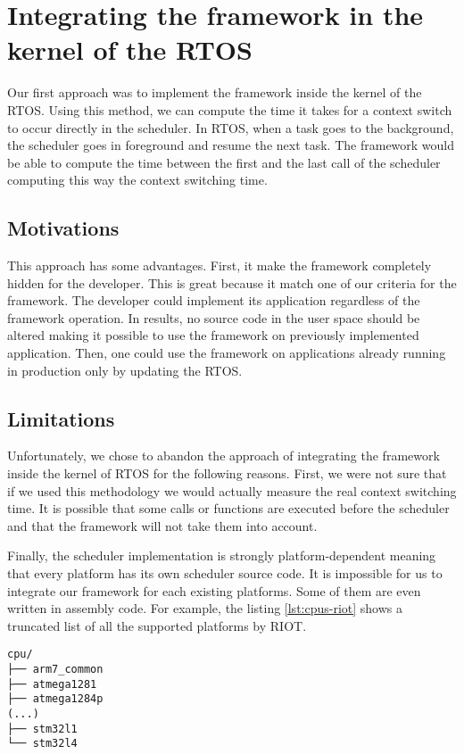 \section{Integrating the framework in the kernel of the RTOS \label{sec:kernel}}

Our first approach was to implement the framework inside the kernel of the RTOS.
Using this method, we can compute the time it takes for a context switch to occur directly in the scheduler.
In RTOS, when a task goes to the background, the scheduler goes in foreground and resume the next task.
The framework would be able to compute the time between the first and the last call of the scheduler computing this way the context switching time.

\subsection{Motivations}

This approach has some advantages.
First, it make the framework completely hidden for the developer.
This is great because it match one of our criteria for the framework.
The developer could implement its application regardless of the framework operation.
In results, no source code in the user space should be altered making it possible to use the framework on previously implemented application.
Then, one could use the framework on applications already running in production only by updating the RTOS.

\subsection{Limitations}

Unfortunately, we chose to abandon the approach of integrating the framework inside the kernel of RTOS for the following reasons.
First, we were not sure that if we used this methodology we would actually measure the real context switching time.
It is possible that some calls or functions are executed before the scheduler and that the framework will not take them into account.

Finally, the scheduler implementation is strongly platform-dependent meaning that every platform has its own scheduler source code.
It is impossible for us to integrate our framework for each existing platforms.
Some of them are even written in assembly code.
For example, the listing \ref{lst:cpus-riot} shows a truncated list of all the supported platforms by RIOT.

\begin{lstlisting}[style=ascii-tree, label={lst:cpus-riot}, caption={truncated list of platforms supported by RIOT}]
cpu/
├── arm7_common
├── atmega1281
├── atmega1284p
(...)
├── stm32l1
└── stm32l4
\end{lstlisting}